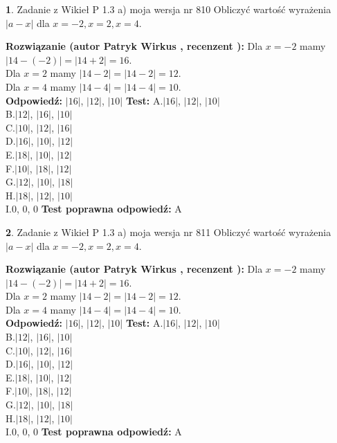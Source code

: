 \documentclass[12pt, a4paper]{article}
\theoremstyle{definition} %
\newtheorem{zad}{}
\newcommand{\zadStart}[1]{\begin{zad}#1\newline}
\newcommand{\zadStop}{\end{zad}}
\newcommand{\rozwStart}[2]{\noindent \textbf{Rozwiązanie (autor #1 , recenzent #2): }\newline}
\newcommand{\rozwStop}{\newline}
\newcommand{\odpStart}{\noindent \textbf{Odpowiedź:}\newline}
\newcommand{\odpStop}{\newline}
\newcommand{\testStart}{\noindent \textbf{Test:}\newline}
\newcommand{\testStop}{\newline}
\newcommand{\kluczStart}{\noindent \textbf{Test poprawna odpowiedź:}\newline}
\newcommand{\kluczStop}{\newline}
\begin{document}
\zadStart{Zadanie z Wikieł P 1.3 a) moja wersja nr 810}
Obliczyć wartość wyrażenia $|a - x|$ dla $x=-2,x=2,x=4$.
\zadStop
\rozwStart{Patryk Wirkus}{}
Dla $x = -2$ mamy $|14 - (-2)| = |14 + 2| = 16$.\\
Dla $x = 2$ mamy $|14 - 2| = |14 - 2| = 12$.\\
Dla $x = 4$ mamy $|14 - 4| = |14 - 4| = 10$.\\
\rozwStop
\odpStart
$|16|$, $|12|$, $|10|$
\odpStop
\testStart
A.$|16|$, $|12|$, $|10|$\\
B.$|12|$, $|16|$, $|10|$\\
C.$|10|$, $|12|$, $|16|$\\
D.$|16|$, $|10|$, $|12|$\\
E.$|18|$, $|10|$, $|12|$\\
F.$|10|$, $|18|$, $|12|$\\
G.$|12|$, $|10|$, $|18|$\\
H.$|18|$, $|12|$, $|10|$\\
I.$0$, $0$, $0$
\testStop
\kluczStart
A
\kluczStop



\zadStart{Zadanie z Wikieł P 1.3 a) moja wersja nr 811}
Obliczyć wartość wyrażenia $|a - x|$ dla $x=-2,x=2,x=4$.
\zadStop
\rozwStart{Patryk Wirkus}{}
Dla $x = -2$ mamy $|14 - (-2)| = |14 + 2| = 16$.\\
Dla $x = 2$ mamy $|14 - 2| = |14 - 2| = 12$.\\
Dla $x = 4$ mamy $|14 - 4| = |14 - 4| = 10$.\\
\rozwStop
\odpStart
$|16|$, $|12|$, $|10|$
\odpStop
\testStart
A.$|16|$, $|12|$, $|10|$\\
B.$|12|$, $|16|$, $|10|$\\
C.$|10|$, $|12|$, $|16|$\\
D.$|16|$, $|10|$, $|12|$\\
E.$|18|$, $|10|$, $|12|$\\
F.$|10|$, $|18|$, $|12|$\\
G.$|12|$, $|10|$, $|18|$\\
H.$|18|$, $|12|$, $|10|$\\
I.$0$, $0$, $0$
\testStop
\kluczStart
A
\kluczStop
\end{document}
